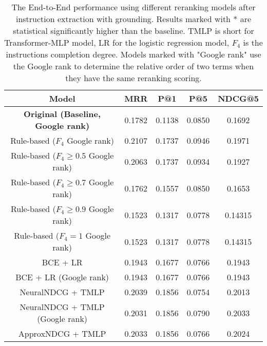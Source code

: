 \begin{table}[ht]
	\caption{The End-to-End performance using different reranking models after instruction extraction with grounding. Results marked with * are statistical significantly higher than the baseline. TMLP is short for Transformer-MLP model, LR for the logistic regression model, $F_4$ is the instructions completion degree. Models marked with "Google rank" use the Google rank to determine the relative order of two terms when they have the same reranking scoring.}
	\label{tab:reranking_end_to_end_performance}
	\begin{tabular}{c|cccc}
			\textbf{Model}                             & \textbf{MRR} & \textbf{P@1} & \textbf{P@5} & \textbf{NDCG@5} \\
			\toprule
			\textbf{Original (Baseline, Google rank)}  & 0.1782       & 0.1138       & 0.0850       & 0.1692          \\
			Rule-based ($F_4$  Google rank)          & 0.2107       & 0.1737       & 0.0946       & 0.1971          \\ %
			Rule-based ($F_4 \geq 0.5$  Google rank) & 0.2063       & 0.1737       & 0.0934       & 0.1927          \\ %
			Rule-based ($F_4 \geq 0.7$  Google rank) & 0.1762       & 0.1557       & 0.0850       & 0.1653          \\ %
			Rule-based ($F_4 \geq 0.9$  Google rank) & 0.1523       & 0.1317       & 0.0778       & 0.14315         \\ %
			Rule-based ($F_4 = 1$  Google rank)      & 0.1523       & 0.1317       & 0.0778       & 0.14315         \\ %
			BCE + LR                                   & 0.1943       & 0.1677       & 0.0766       & 0.1943          \\ %
			BCE + LR (Google rank)                     & 0.1943       & 0.1677       & 0.0766       & 0.1943          \\
			NeuralNDCG + TMLP                          & 0.2039       & 0.1856       & 0.0754       & 0.2013          \\
			NeuralNDCG + TMLP (Google rank)            & 0.2031       & 0.1856       & 0.0790       & 0.2033          \\
			ApproxNDCG + TMLP                          & 0.2033       & 0.1856       & 0.0766       & 0.2024          \\

\end{tabular}
\end{table}
